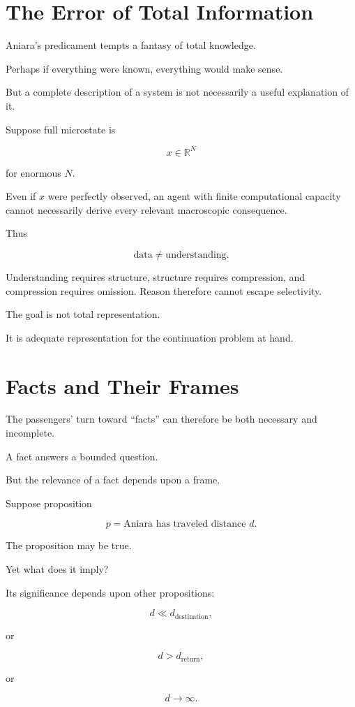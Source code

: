 \documentclass[11pt,oneside]{book}
\theoremstyle{definition}
\theoremstyle{remark}
\begin{document}
\section{The Error of Total Information}

Aniara's predicament tempts a fantasy of total knowledge.

Perhaps if everything were known, everything would make sense.

But a complete description of a system is not necessarily a useful explanation of it.

Suppose full microstate is

\[
x\in\mathbb R^N
\]

for enormous \(N\).

Even if \(x\) were perfectly observed, an agent with finite computational capacity cannot necessarily derive every relevant macroscopic consequence.

Thus

\[
\text{data}
\neq
\text{understanding}.
\]

Understanding requires structure, structure requires compression, and compression requires omission. Reason therefore cannot escape selectivity.

The goal is not total representation.

It is adequate representation for the continuation problem at hand.

\section{Facts and Their Frames}

The passengers' turn toward ``facts'' can therefore be both necessary and incomplete.

A fact answers a bounded question.

But the relevance of a fact depends upon a frame.

Suppose proposition

\[
p=\text{Aniara has traveled distance }d.
\]

The proposition may be true.

Yet what does it imply?

Its significance depends upon other propositions:

\[
d\ll d_{\mathrm{destination}},
\]

or

\[
d>d_{\mathrm{return}},
\]

or

\[
d\rightarrow\infty.
\]
\end{document}
